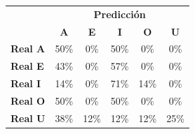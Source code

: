 \begin{tabular}{lccccc}
\toprule
 & \multicolumn{5}{c}{\textbf{Predicción}} \\
 & \textbf{A} & \textbf{E} & \textbf{I} & \textbf{O} & \textbf{U} \\
\midrule
\textbf{Real A} & \cellcolor[rgb]{0.65,0.65,1.00} \color{white} 50\% & \cellcolor[rgb]{1.00,1.00,1.00}  0\% & \cellcolor[rgb]{0.65,0.65,1.00} \color{white} 50\% & \cellcolor[rgb]{1.00,1.00,1.00}  0\% & \cellcolor[rgb]{1.00,1.00,1.00}  0\% \\
\textbf{Real E} & \cellcolor[rgb]{0.70,0.70,1.00}  43\% & \cellcolor[rgb]{1.00,1.00,1.00}  0\% & \cellcolor[rgb]{0.60,0.60,1.00} \color{white} 57\% & \cellcolor[rgb]{1.00,1.00,1.00}  0\% & \cellcolor[rgb]{1.00,1.00,1.00}  0\% \\
\textbf{Real I} & \cellcolor[rgb]{0.90,0.90,1.00}  14\% & \cellcolor[rgb]{1.00,1.00,1.00}  0\% & \cellcolor[rgb]{0.50,0.50,1.00} \color{white} 71\% & \cellcolor[rgb]{0.90,0.90,1.00}  14\% & \cellcolor[rgb]{1.00,1.00,1.00}  0\% \\
\textbf{Real O} & \cellcolor[rgb]{0.65,0.65,1.00} \color{white} 50\% & \cellcolor[rgb]{1.00,1.00,1.00}  0\% & \cellcolor[rgb]{0.65,0.65,1.00} \color{white} 50\% & \cellcolor[rgb]{1.00,1.00,1.00}  0\% & \cellcolor[rgb]{1.00,1.00,1.00}  0\% \\
\textbf{Real U} & \cellcolor[rgb]{0.74,0.74,1.00}  38\% & \cellcolor[rgb]{0.91,0.91,1.00}  12\% & \cellcolor[rgb]{0.91,0.91,1.00}  12\% & \cellcolor[rgb]{0.91,0.91,1.00}  12\% & \cellcolor[rgb]{0.82,0.82,1.00}  25\% \\
\bottomrule
\end{tabular}